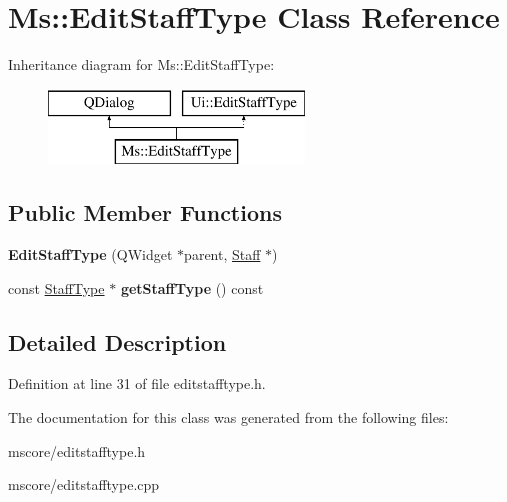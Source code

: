 \hypertarget{class_ms_1_1_edit_staff_type}{}\section{Ms\+:\+:Edit\+Staff\+Type Class Reference}
\label{class_ms_1_1_edit_staff_type}
Inheritance diagram for Ms\+:\+:Edit\+Staff\+Type\+:\begin{figure}[H]
\begin{center}
\leavevmode
\includegraphics[height=2.000000cm]{class_ms_1_1_edit_staff_type}
\end{center}
\end{figure}
\subsection*{Public Member Functions}
\begin{DoxyCompactItemize}
\item 
\mbox{\label{class_ms_1_1_edit_staff_type_a4b7df78159d129bf2ca515b291eef141}} 
{\bfseries Edit\+Staff\+Type} (Q\+Widget $\ast$parent, \hyperlink{class_ms_1_1_staff}{Staff} $\ast$)
\item 
\mbox{\label{class_ms_1_1_edit_staff_type_a4f58779bc603d3b261e6d96ea7ee376b}} 
const \hyperlink{class_ms_1_1_staff_type}{Staff\+Type} $\ast$ {\bfseries get\+Staff\+Type} () const
\end{DoxyCompactItemize}


\subsection{Detailed Description}


Definition at line 31 of file editstafftype.\+h.



The documentation for this class was generated from the following files\+:\begin{DoxyCompactItemize}
\item 
mscore/editstafftype.\+h\item 
mscore/editstafftype.\+cpp\end{DoxyCompactItemize}
